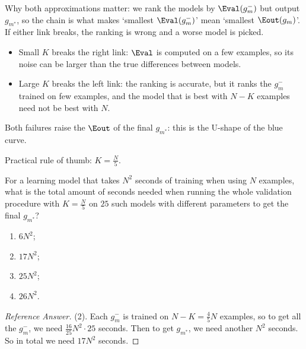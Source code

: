 \begin{remark}
    Why both approximations matter: we rank the models by
    \(\Eval(g_m^-)\) but output \(g_{m^*}\), so the chain is what makes
    `smallest \(\Eval(g_m^-)\)' mean `smallest \(\Eout(g_m)\)'. If either link
    breaks, the ranking is wrong and a worse model is picked.
    \begin{itemize}
        \item Small \(K\) breaks the right link: \(\Eval\) is computed on a few
            examples, so its noise can be larger than the true differences
            between models.
        \item Large \(K\) breaks the left link: the ranking is accurate, but it
            ranks the \(g_m^-\) trained on few examples, and the model that is
            best with \(N - K\) examples need not be best with \(N\).
    \end{itemize}
    Both failures raise the \(\Eout\) of the final \(g_{m^*}\): this is the
    U-shape of the blue curve.
\end{remark}

\begin{moral}
    Practical rule of thumb: \(K = \frac{N}{5}\).
\end{moral}

\begin{exercise}
    For a learning model that takes \(N^2\) seconds of training when using
    \(N\) examples, what is the total amount of seconds needed when running
    the whole validation procedure with \(K = \frac{N}{5}\) on \(25\) such
    models with different parameters to get the final \(g_{m^*}\)?
    \begin{enumerate}[(1)]
        \item \(6N^2\);
        \item \(17N^2\);
        \item \(25N^2\);
        \item \(26N^2\).
    \end{enumerate}
\end{exercise}

\begin{proof}[Reference Answer]
    (2). Each \(g_m^-\) is trained on \(N - K = \frac{4}{5} N\) examples, so to
    get all the \(g_m^-\), we need \(\frac{16}{25} N^2 \cdot 25\) seconds. Then
    to get \(g_{m^*}\), we need another \(N^2\) seconds. So in total we need
    \(17N^2\) seconds.
\end{proof}

